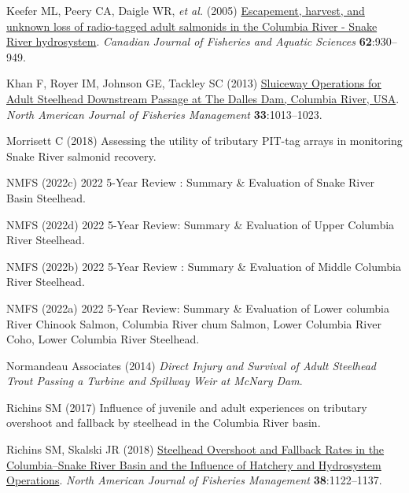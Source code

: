 \documentclass[
  12pt,
]{report}
\newlength{\cslhangindent}
\newlength{\cslentryspacingunit} %
\newenvironment{CSLReferences}[2] %
 {%
  \setlength{\parindent}{0pt}
  \ifodd #1
  \let\oldpar\par
  \def\par{\hangindent=\cslhangindent\oldpar}
  \fi
  \setlength{\parskip}{#2\cslentryspacingunit}
 }%
 {}
\begin{document}
\begin{CSLReferences}{1}{0}
\leavevmode{}%
Keefer ML, Peery CA, Daigle WR, \emph{et al.} (2005)
\href{https://doi.org/10.1139/f04-246}{{Escapement, harvest, and unknown
loss of radio-tagged adult salmonids in the Columbia River - Snake River
hydrosystem}}. \emph{Canadian Journal of Fisheries and Aquatic Sciences}
\textbf{62}:930--949.

\leavevmode{}%
Khan F, Royer IM, Johnson GE, Tackley SC (2013)
\href{https://doi.org/10.1080/02755947.2013.793629}{{Sluiceway
Operations for Adult Steelhead Downstream Passage at The Dalles Dam,
Columbia River, USA}}. \emph{North American Journal of Fisheries
Management} \textbf{33}:1013--1023.

\leavevmode{}%
Morrisett C (2018) {Assessing the utility of tributary PIT-tag arrays in
monitoring Snake River salmonid recovery}.

\leavevmode{}%
NMFS (2022c) {2022 5-Year Review : Summary \& Evaluation of Snake River
Basin Steelhead}.

\leavevmode{}%
NMFS (2022d) {2022 5-Year Review: Summary \& Evaluation of Upper
Columbia River Steelhead}.

\leavevmode{}%
NMFS (2022b) {2022 5-Year Review : Summary \& Evaluation of Middle
Columbia River Steelhead}.

\leavevmode{}%
NMFS (2022a) {2022 5-Year Review: Summary \& Evaluation of Lower
columbia River Chinook Salmon, Columbia River chum Salmon, Lower
Columbia River Coho, Lower Columbia River Steelhead}.

\leavevmode{}%
Normandeau Associates (2014) \emph{{Direct Injury and Survival of Adult
Steelhead Trout Passing a Turbine and Spillway Weir at McNary Dam}}.

\leavevmode{}%
Richins SM (2017) {Influence of juvenile and adult experiences on
tributary overshoot and fallback by steelhead in the Columbia River
basin}.

\leavevmode{}%
Richins SM, Skalski JR (2018)
\href{https://doi.org/10.1002/nafm.10219}{{Steelhead Overshoot and
Fallback Rates in the Columbia--Snake River Basin and the Influence of
Hatchery and Hydrosystem Operations}}. \emph{North American Journal of
Fisheries Management} \textbf{38}:1122--1137.


\end{CSLReferences}
\end{document}
